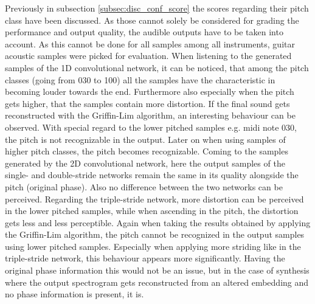 Previously in subsection \ref{subsec:disc_conf_score} the scores regarding their pitch class have been discussed. As those cannot solely be considered for grading the performance and output quality, the audible outputs have to be taken into account. As this cannot be done for all samples among all instruments, guitar acoustic samples were picked for evaluation. When listening to the generated samples of the 1D convolutional network, it can be noticed, that among the pitch classes (going from 030 to 100) all the samples have the characteristic in becoming louder towards the end. Furthermore also especially when the pitch gets higher, that the samples contain more distortion. If the final sound gets reconstructed with the Griffin-Lim algorithm, an interesting behaviour can be observed. With special regard to the lower pitched samples e.g. midi note 030, the pitch is not recognizable in the output. Later on when using samples of higher pitch classes, the pitch becomes recognizable. 
Coming to the samples generated by the 2D convolutional network, here the output samples of the single- and double-stride networks remain the same in its quality alongside the pitch (original phase). Also no difference between the two networks can be perceived. Regarding the triple-stride network, more distortion can be perceived in the lower pitched samples, while when ascending in the pitch, the distortion gets less and less perceptible. Again when taking the results obtained by applying the Griffin-Lim algorithm, the pitch cannot be recognized in the output samples using lower pitched samples. Especially when applying more striding like in the triple-stride network, this behaviour appears more significantly. Having the original phase information this would not be an issue, but in the case of synthesis where the output spectrogram gets reconstructed from an altered embedding and no phase information is present, it is. 

